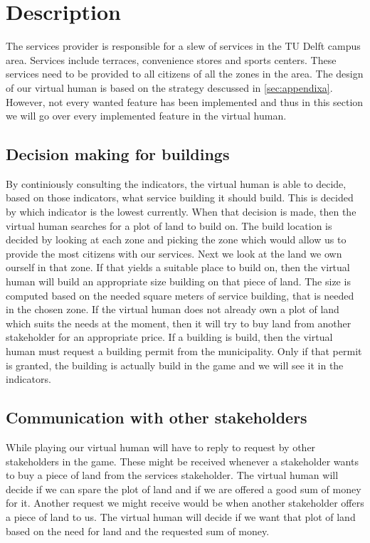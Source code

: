 \section{Description}
The services provider is responsible for a slew of services in the TU Delft campus area. Services include terraces, convenience stores and sports centers. These services need to be provided to all citizens of all the zones in the area. The design of our virtual human is based on the strategy descussed in \ref{sec:appendixa}. However, not every wanted feature has been implemented and thus in this section we will go over every implemented feature in the virtual human.

\subsection{Decision making for buildings}
By continiously consulting the indicators, the virtual human is able to decide, based on those indicators, what service building it should build. This is decided by which indicator is the lowest currently. When that decision is made, then the virtual human searches for a plot of land to build on. The build location is decided by looking at each zone and picking the zone which would allow us to provide the most citizens with our services. Next we look at the land we own ourself in that zone. If that yields a suitable place to build on, then the virtual human will build an appropriate size building on that piece of land. The size is computed based on the needed square meters of service building, that is needed in the chosen zone. If the virtual human does not already own a plot of land which suits the needs at the moment, then it will try to buy land from another stakeholder for an appropriate price. 
If a building is build, then the virtual human must request a building permit from the municipality. Only if that permit is granted, the building is actually build in the game and we will see it in the indicators. 

\subsection{Communication with other stakeholders}
While playing our virtual human will have to reply to request by other stakeholders in the game. These might be received whenever a stakeholder wants to buy a piece of land from the services stakeholder. The virtual human will decide if we can spare the plot of land and if we are offered a good sum of money for it. Another request we might receive would be when another stakeholder offers a piece of land to us. The virtual human will decide if we want that plot of land based on the need for land and the requested sum of money.

\newpage